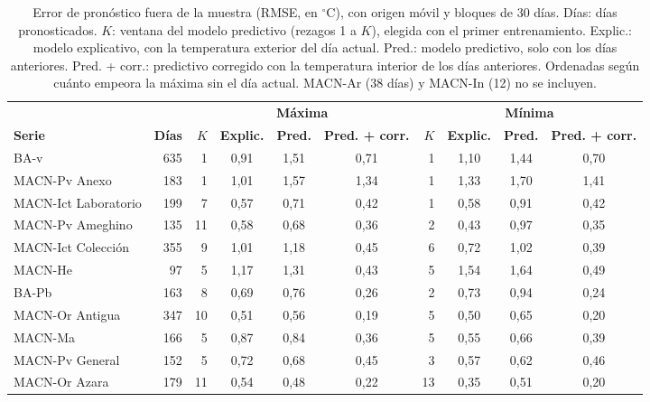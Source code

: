 \documentclass[11pt,a4paper]{article}
\begin{document}
\begin{table}[htbp]
\centering
\footnotesize
\setlength{\tabcolsep}{4pt}
\caption{Error de pronóstico fuera de la muestra (RMSE, en $^\circ$C), con origen móvil y bloques de 30 días. Días: días pronosticados. $K$: ventana del modelo predictivo (rezagos 1 a $K$), elegida con el primer entrenamiento. Explic.: modelo explicativo, con la temperatura exterior del día actual. Pred.: modelo predictivo, solo con los días anteriores. Pred. + corr.: predictivo corregido con la temperatura interior de los días anteriores. Ordenadas según cuánto empeora la máxima sin el día actual. MACN-Ar (38 días) y MACN-In (12) no se incluyen.}
\label{tab:pronostico}
\begin{tabular}{l r @{\hspace{10pt}} r c c c @{\hspace{10pt}} r c c c}
\toprule
 & & \multicolumn{4}{c}{\textbf{Máxima}} & \multicolumn{4}{c}{\textbf{Mínima}} \\
\cmidrule(lr){3-6}\cmidrule(lr){7-10}
\textbf{Serie} & \textbf{Días} & $K$ & \textbf{Explic.} & \textbf{Pred.} & \textbf{Pred. + corr.} & $K$ & \textbf{Explic.} & \textbf{Pred.} & \textbf{Pred. + corr.} \\
\midrule
BA-v                   & 635 &  1 & 0{,}91 & 1{,}51 & 0{,}71 &  1 & 1{,}10 & 1{,}44 & 0{,}70 \\
MACN-Pv Anexo          & 183 &  1 & 1{,}01 & 1{,}57 & 1{,}34 &  1 & 1{,}33 & 1{,}70 & 1{,}41 \\
MACN-Ict Laboratorio   & 199 &  7 & 0{,}57 & 0{,}71 & 0{,}42 &  1 & 0{,}58 & 0{,}91 & 0{,}42 \\
MACN-Pv Ameghino       & 135 & 11 & 0{,}58 & 0{,}68 & 0{,}36 &  2 & 0{,}43 & 0{,}97 & 0{,}35 \\
MACN-Ict Colección     & 355 &  9 & 1{,}01 & 1{,}18 & 0{,}45 &  6 & 0{,}72 & 1{,}02 & 0{,}39 \\
MACN-He                &  97 &  5 & 1{,}17 & 1{,}31 & 0{,}43 &  5 & 1{,}54 & 1{,}64 & 0{,}49 \\
BA-Pb                  & 163 &  8 & 0{,}69 & 0{,}76 & 0{,}26 &  2 & 0{,}73 & 0{,}94 & 0{,}24 \\
MACN-Or Antigua        & 347 & 10 & 0{,}51 & 0{,}56 & 0{,}19 &  5 & 0{,}50 & 0{,}65 & 0{,}20 \\
MACN-Ma                & 166 &  5 & 0{,}87 & 0{,}84 & 0{,}36 &  5 & 0{,}55 & 0{,}66 & 0{,}39 \\
MACN-Pv General        & 152 &  5 & 0{,}72 & 0{,}68 & 0{,}45 &  3 & 0{,}57 & 0{,}62 & 0{,}46 \\
MACN-Or Azara          & 179 & 11 & 0{,}54 & 0{,}48 & 0{,}22 & 13 & 0{,}35 & 0{,}51 & 0{,}20 \\
\bottomrule
\end{tabular}
\end{table}
\end{document}
